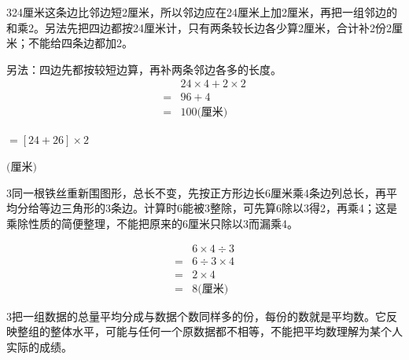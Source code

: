 \documentclass[multi=snippet,border={5bp 20bp 5bp 5bp}]{standalone}
\newenvironment{snippet}[3]{\begin{minipage}{#1bp}\color{answerred}\fontsize{#2}{#3}\selectfont\raggedright}{\end{minipage}}
\begin{document}
\begin{snippet}{505}{11.5}{14}\begin{multicols}{3}\raggedcolumns 24厘米这条边比邻边短2厘米，所以邻边应在24厘米上加2厘米，再把一组邻边的和乘2。另法先把四边都按24厘米计，只有两条较长边各少算2厘米，合计补2份2厘米；不能给四条边都加2。\par 另法：四边先都按较短边算，再补两条邻边各多的长度。\[\begin{aligned}&24\times4+2\times2\\={}&96+4\\={}&100\text{(厘米)}\end{aligned}\]\end{multicols}\end{snippet}
\begin{snippet}{72.05178222656252}{9}{12.8}\SourceSans\setlength{\mathindent}{2bp}\(\displaystyle=[24+26]\times2\)\end{snippet}
\begin{snippet}{80}{9.0}{14}\SourceSans\setlength{\mathindent}{2bp}\(\text{(厘米)}\)\end{snippet}
\begin{snippet}{505}{11.5}{14}\begin{multicols}{3}\raggedcolumns 同一根铁丝重新围图形，总长不变，先按正方形边长6厘米乘4条边列总长，再平均分给等边三角形的3条边。计算时6能被3整除，可先算6除以3得2，再乘4；这是乘除性质的简便整理，不能把原来的6厘米只除以3而漏乘4。\end{multicols}\end{snippet}
\begin{snippet}{319}{10.5}{12.8}\SourceSans\setlength{\mathindent}{2bp}\[\begin{aligned}&6\times4\div3\\={}&6\div3\times4\\={}&2\times4\\={}&8\text{(厘米)}\end{aligned}\]\end{snippet}
\begin{snippet}{505}{11.5}{14}\begin{multicols}{3}\raggedcolumns 把一组数据的总量平均分成与数据个数同样多的份，每份的数就是平均数。它反映整组的整体水平，可能与任何一个原数据都不相等，不能把平均数理解为某个人实际的成绩。\end{multicols}\end{snippet}
\end{document}
